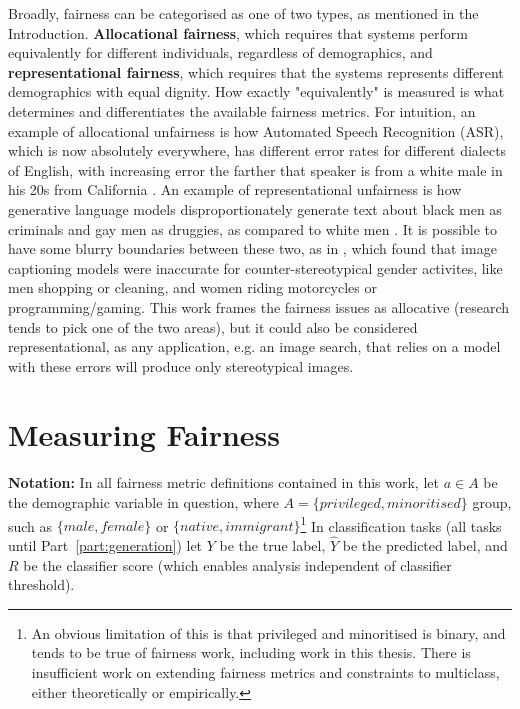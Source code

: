 Broadly, fairness can be categorised as one of two types, as mentioned in the Introduction. \textbf{Allocational fairness}, which requires that systems perform equivalently for different individuals, regardless of demographics, and \textbf{representational fairness}, which requires that the systems represents different demographics with equal dignity. How exactly "equivalently" is measured is what determines and differentiates the available fairness metrics. For intuition, an example of allocational unfairness is how Automated Speech Recognition (ASR), which is now absolutely everywhere, has different error rates for different dialects of English, with increasing error the farther that speaker is from a white male in his 20s from California \citep{tatman17_interspeech}. An example of representational unfairness is how generative language models disproportionately generate text about black men as criminals and gay men as druggies, as compared to white men \citep{sheng-etal-2019-woman}. It is possible to have some blurry boundaries between these two, as in \citet{zhao-etal-2017-men}, which found that image captioning models were inaccurate for counter-stereotypical gender activites, like men shopping or cleaning, and women riding motorcycles or programming/gaming. This work frames the fairness issues as allocative (research tends to pick one of the two areas), but it could also be considered representational, as any application, e.g. an image search, that relies on a model with these errors will produce only stereotypical images.

\section{Measuring Fairness}
\label{sec:measuring_fairness}

\textbf{Notation:} In all fairness metric definitions contained in this work, let $a \in A$ be the demographic variable in question, where $A = \{privileged, minoritised\}$ group, such as $\{male, female\}$ or $\{native, immigrant\}$\footnote{An obvious limitation of this is that privileged and minoritised is binary, and tends to be true of fairness work, including work in this thesis. There is insufficient work on extending fairness metrics and constraints to multiclass, either theoretically or empirically.} In classification tasks (all tasks until Part~\ref{part:generation}) let $Y$ be the true label, $\hat{Y}$ be the predicted label, and $R$ be the classifier score (which enables analysis independent of classifier threshold). 


